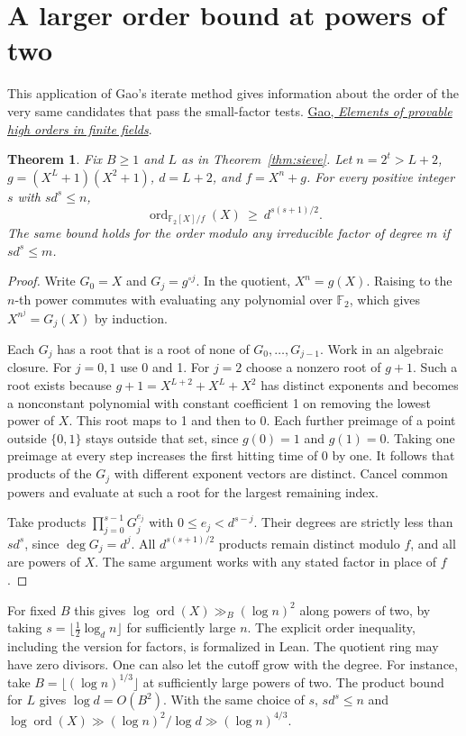 \documentclass[11pt]{article}
\newtheorem{theorem}{Theorem}
\newcommand{\F}{\mathbb F_2}
\newcommand{\ord}{\operatorname{ord}}
\begin{document}
\section{A larger order bound at powers of two}
This application of Gao's iterate method gives information about the order of
the very same candidates that pass the small-factor tests.
\href{https://www.math.clemson.edu/~sgao/papers/Gao99.pdf}{Gao, \emph{Elements of provable high orders in finite fields}}.

\begin{theorem}
Fix \(B\ge1\) and \(L\) as in Theorem~\ref{thm:sieve}.
Let \(n=2^t>L+2\), \(g=(X^L+1)(X^2+1)\), \(d=L+2\), and \(f=X^n+g\).
For every positive integer \(s\) with \(s d^s\le n\),
\[
   \ord_{\F[X]/f}(X)\ \ge\ d^{s(s+1)/2}.
\]
The same bound holds for the order modulo any irreducible factor of degree
\(m\) if \(s d^s\le m\).
\end{theorem}
\begin{proof}
Write \(G_0=X\) and \(G_j=g^{\circ j}\). In the quotient, \(X^n=g(X)\).
Raising to the \(n\)-th power commutes with evaluating any polynomial over
\(\F\), which gives \(X^{n^j}=G_j(X)\) by induction.

Each \(G_j\) has a root that is a root of none of \(G_0,\ldots,G_{j-1}\).
Work in an algebraic closure. For \(j=0,1\) use 0 and 1.
For \(j=2\) choose a nonzero root of \(g+1\). Such a root exists because
\(g+1=X^{L+2}+X^L+X^2\) has distinct exponents and becomes a nonconstant
polynomial with constant coefficient 1 on removing the lowest power of \(X\).
This root maps to 1 and then to 0. Each further preimage of a point outside
\(\{0,1\}\) stays outside that set, since \(g(0)=1\) and \(g(1)=0\).
Taking one preimage at every step increases the first hitting time of 0 by one.
It follows that products of the \(G_j\) with different exponent vectors are
distinct. Cancel common powers and evaluate at such a root for the largest
remaining index.

Take products \(\prod_{j=0}^{s-1}G_j^{e_j}\) with \(0\le e_j<d^{s-j}\).
Their degrees are strictly less than \(s d^s\), since \(\deg G_j=d^j\).
All \(d^{s(s+1)/2}\) products remain distinct modulo \(f\), and all are
powers of \(X\). The same argument works with any stated factor in place of \(f\).
\end{proof}
For fixed \(B\) this gives \(\log\ord(X)\gg_B(\log n)^2\) along powers of two,
by taking \(s=\lfloor\tfrac12\log_d n\rfloor\) for sufficiently large \(n\).
The explicit order inequality, including the version for factors, is formalized
in Lean. The quotient ring may have zero divisors.
One can also let the cutoff grow with the degree. For instance, take
\(B=\lfloor(\log n)^{1/3}\rfloor\) at sufficiently large powers of two.
The product bound for \(L\) gives \(\log d=O(B^2)\). With the same choice of \(s\),
\(s d^s\le n\) and \(\log\ord(X)\gg(\log n)^2/\log d\gg(\log n)^{4/3}\).
\end{document}
